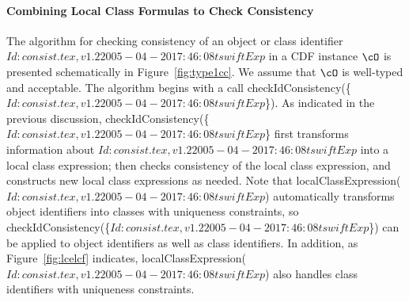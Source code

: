 \paragraph*{Combining Local Class Formulas to Check Consistency}
The algorithm for checking consistency of an object or class
identifier $Id: consist.tex,v 1.2 2005-04-20 17:46:08 tswift Exp $ in a CDF instance $\cO$ is presented schematically in
Figure~\ref{fig:type1cc}.  We assume that $\cO$ is well-typed and
acceptable.  The algorithm begins with a call {\sf
checkIdConsistency(\{$Id: consist.tex,v 1.2 2005-04-20 17:46:08 tswift Exp $\})}.  As indicated in the previous
discussion, {\sf checkIdConsistency(\{$Id: consist.tex,v 1.2 2005-04-20 17:46:08 tswift Exp $\}} first transforms
information about $Id: consist.tex,v 1.2 2005-04-20 17:46:08 tswift Exp $ into a local class expression; then checks
consistency of the local class expression, and constructs new local
class expressions as needed.  Note that {\sf
localClassExpression($Id: consist.tex,v 1.2 2005-04-20 17:46:08 tswift Exp $)} automatically transforms object
identifiers into classes with uniqueness constraints, so {\sf
checkIdConsistency(\{$Id: consist.tex,v 1.2 2005-04-20 17:46:08 tswift Exp $\})} can be applied to object identifiers as
well as class identifiers.  In addition, as Figure~\ref{fig:lcelcf}
indicates, {\sf localClassExpression($Id: consist.tex,v 1.2 2005-04-20 17:46:08 tswift Exp $)} also handles class
identifiers with uniqueness constraints.

